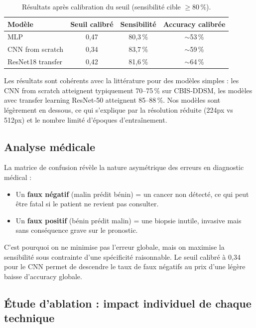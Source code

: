 \documentclass[a4paper,10pt]{article}
\begin{document}
\begin{table}[H]
\centering
\caption{Résultats après calibration du seuil (sensibilité cible $\geq 80\,\%$).}
\begin{tabular}{lccc}
\toprule
\textbf{Modèle} & \textbf{Seuil calibré} & \textbf{Sensibilité} & \textbf{Accuracy calibrée} \\
\midrule
MLP                   & 0,47 & 80,3\,\% & $\sim$53\,\% \\
CNN from scratch      & 0,34 & 83,7\,\% & $\sim$59\,\% \\
ResNet18 transfer     & 0,42 & 81,6\,\% & $\sim$64\,\% \\
\bottomrule
\end{tabular}
\label{tab:ddsm_calibre}
\end{table}

Les résultats sont cohérents avec la littérature pour des modèles simples :
les CNN from scratch atteignent typiquement 70--75\,\% sur CBIS-DDSM,
les modèles avec transfer learning ResNet-50 atteignent 85--88\,\%.
Nos modèles sont légèrement en dessous, ce qui s'explique par la résolution réduite (224px vs 512px)
et le nombre limité d'époques d'entraînement.

\subsection{Analyse médicale}

La matrice de confusion révèle la nature asymétrique des erreurs en diagnostic médical :

\begin{itemize}
    \item Un \textbf{faux négatif} (malin prédit bénin) = un cancer non détecté,
          ce qui peut être fatal si le patient ne revient pas consulter.
    \item Un \textbf{faux positif} (bénin prédit malin) = une biopsie inutile,
          invasive mais sans conséquence grave sur le pronostic.
\end{itemize}

C'est pourquoi on ne minimise pas l'erreur globale, mais on maximise la sensibilité
sous contrainte d'une spécificité raisonnable.
Le seuil calibré à 0,34 pour le CNN permet de descendre le taux de faux négatifs
au prix d'une légère baisse d'accuracy globale.

\subsection{Étude d'ablation : impact individuel de chaque technique}
\end{document}
